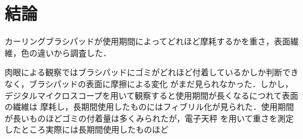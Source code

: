 \documentclass[main]{subfiles}
\begin{document}
\chapter{結論}
カーリングブラシパッドが使用期間によってどれほど摩耗するかを重さ，表面繊維，色の違いから調査した．

肉眼による観察ではブラシパッドにゴミがどれほど付着しているかしか判断できなく，ブラシパッドの表面に摩擦による変化
がまだ見られなかった．しかし，デジタルマイクロスコープを用いて観察すると使用期間が長くなるにつれて表面の繊維は
摩耗し，長期間使用したものにはフィブリル化が見られた．使用期間が長いものほどゴミの付着量は多くみられたが，電子天秤
を用いて重さを測定したところ実際には長期間使用したものほど
\end{document}
